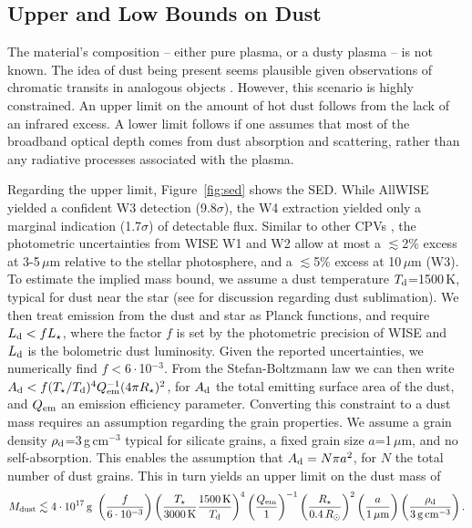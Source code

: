 \documentclass{nature3}
\begin{document}
\begin{methods}
\subsection{Upper and Low Bounds on Dust}\phantom{+}
\label{subsec:dust}

The material's composition -- either pure plasma, or a
dusty plasma -- is not known.  The idea of dust being
present seems plausible given observations of chromatic transits in
analogous objects \cite{Tanimoto2020,Gunther2022,Koen2023}.  However, this
scenario is highly constrained.  An upper limit on the amount of hot
dust follows from the lack of an infrared excess.  A lower limit
follows if one assumes that most of the broadband optical depth comes
from dust absorption and scattering, rather than any radiative
processes associated with the plasma.

Regarding the upper limit, Figure~\ref{fig:sed} shows the SED.  While
AllWISE \cite{Cutri2014} yielded a confident W3 detection
(9.8$\sigma$), the W4 extraction yielded only a marginal indication
(1.7$\sigma$) of detectable flux.  Similar to other CPVs
\cite{Stauffer2017,Bouma2024}, the photometric uncertainties from WISE
W1 and W2 allow at most a $\lesssim$2\% excess at 3-5\,$\mu$m relative
to the stellar photosphere, and a $\lesssim$5\% excess at 10\,$\mu$m
(W3).  To estimate the implied mass bound, we assume a dust
temperature $T_{\rm d}$=1500\,K, typical for dust near the star (see
\cite{Zhan2019} for discussion regarding dust sublimation).  We then
treat emission from the dust and star as Planck functions, and
require $L_{\rm d} < f L_\star$, where the factor $f$ is set by
the photometric precision of WISE and $L_{\rm d}$ is the bolometric dust
luminosity.  Given the reported uncertainties, we numerically find
$f<6\cdot$10$^{-3}$.  From the Stefan-Boltzmann law we can then write
$A_{\rm d} < f (T_\star / T_{\rm d})^4 Q_{\rm em}^{-1} (4\pi
R_\star)^2$, for $A_{\rm d}$ the total emitting surface area of the
dust, and $Q_{\rm em}$ an emission efficiency parameter.
Converting this constraint to a dust mass requires an assumption
regarding the grain properties.  We assume a grain density $\rho_{\rm
d}$=3\,g\,cm$^{-3}$ typical for silicate grains, a fixed grain size
$a$=1\,$\mu$m, and no
self-absorption.  This enables the assumption that $A_{\rm d} = N \pi
a^2$, for $N$ the total number of dust grains.  This in turn yields an
upper limit on the dust mass of
\begin{equation}
  M_{\rm dust} \lesssim 4 \cdot 10^{17}\, {\rm g}\ 
  \left( \frac{f}{6\cdot10^{-3}} \right)
  \left( \frac{T_\star}{3000\,{\rm K}} \frac{1500\,{\rm K}}{T_{\rm d}} \right)^4
  \left( \frac{Q_{\rm em}}{1} \right)^{-1}
  \left( \frac{R_\star}{0.4\,R_\odot} \right)^2
  \left( \frac{a}{1\,\mathrm{\mu m}} \right)
  \left( \frac{\rho_{\rm d}}{3\,\mathrm{g\,cm^{-3}}} \right).
\end{equation}


\end{methods}
\end{document}
